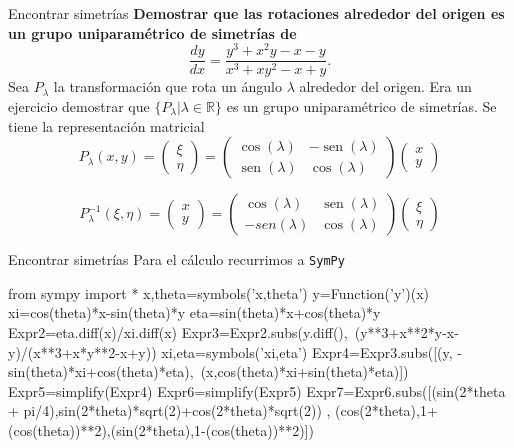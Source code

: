 \documentclass[handout,hyperref={colorlinks=true}]{beamer}
\newcommand{\rr}{\mathbb{R}}
\DeclareMathOperator{\sen}{sen}
\begin{document}
\begin{frame}{Encontrar simetrías}
\textbf{Demostrar que las rotaciones alrededor del origen es un grupo uniparamétrico de simetrías de}
 \[\frac{dy}{dx}=\frac{y^3+x^2y-x-y}{x^3+xy^2-x+y}.\]
Sea $P_{\lambda}$ la transformación que rota un ángulo $\lambda$ alrededor del origen. Era un ejercicio demostrar que  $\{P_{\lambda}|\lambda\in\rr\}$ es un grupo uniparamétrico de simetrías. Se tiene la representación matricial
\[
P_{\lambda}(x,y)= \begin{pmatrix} \xi\\ \eta
\end{pmatrix}=\begin{pmatrix} \cos(\lambda) & -\sen(\lambda)
\\ \sen(\lambda) & \cos(\lambda)
\end{pmatrix} \begin{pmatrix} x\\ y
\end{pmatrix}
\]

\[
P^{-1}_{\lambda}(\xi,\eta)= \begin{pmatrix} x\\ y
\end{pmatrix}=\begin{pmatrix} \cos(\lambda) & \sen(\lambda)
\\ -sen(\lambda) & \cos(\lambda)
\end{pmatrix} \begin{pmatrix} \xi\\ \eta
\end{pmatrix}
\]



\end{frame}


\begin{frame}[fragile]{Encontrar simetrías}
 Para el cálculo recurrimos a \texttt{SymPy}
\begin{sageblock}
from sympy import *
x,theta=symbols('x,theta')
y=Function('y')(x)
xi=cos(theta)*x-sin(theta)*y
eta=sin(theta)*x+cos(theta)*y
Expr2=eta.diff(x)/xi.diff(x)
Expr3=Expr2.subs(y.diff(),\
(y**3+x**2*y-x-y)/(x**3+x*y**2-x+y))
xi,eta=symbols('xi,eta')
Expr4=Expr3.subs([(y, -sin(theta)*xi+cos(theta)*eta),\
(x,cos(theta)*xi+sin(theta)*eta)])
Expr5=simplify(Expr4)
Expr6=simplify(Expr5)
Expr7=Expr6.subs([(sin(2*theta + pi/4),sin(2*theta)*sqrt(2)+cos(2*theta)*sqrt(2))  , (cos(2*theta),1+(cos(theta))**2),(sin(2*theta),1-(cos(theta))**2)])
\end{sageblock}
\end{frame}
\end{document}
